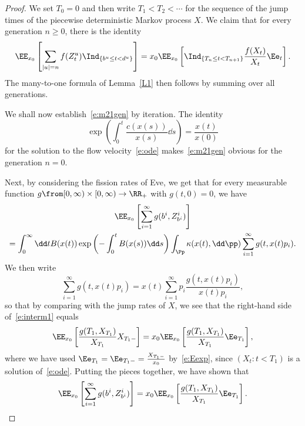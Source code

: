\begin{proof}
We set $T_0=0$ and then write $T_1<T_2<\dotsb$ for the sequence of the jump times of the piecewise deterministic Markov process $X$. We claim that for every generation $n\geq 0$, there is the identity
\begin{equation}\label{e:m21gen}
\EE_{x_0} \left[\sum_{|u|=n} f(Z^u_t) \Ind_{\{b^u \leq t < d^u\}} \right] = x_0\EE_{x_0}\left[\Ind_{\{T_n \leq t < T_{n+1}\}}\frac{f(X_t)}{X_t}\Ee_t \right].
\end{equation}
The many-to-one formula of Lemma~\ref{L1} then follows by summing over all generations.

We shall now establish~\eqref{e:m21gen} by iteration. The identity
\begin{equation}\label{e:Eexp}
\exp\left(\int_0^t \frac{c(x(s))}{x(s)}\dd s\right) = \frac{x(t)}{x(0)}
\end{equation}
for the solution to the flow velocity~\eqref{e:ode} makes~\eqref{e:m21gen} obvious for the generation $n=0$.


Next, by considering the fission rates of Eve, we get that for every measurable function $g\from [0,\infty)\times [0,\infty)\to \RR_+$ with $g(t,0)=0$, we have
\begin{multline}\label{e:interm1}
\EE_{x_0}\left[\sum_{i=1}^{\infty} g(b^i, Z^i_{b^i})\right] \\
=\int_0^{\infty} \dd t {B}(x(t)) \exp\left(-\int_0^t {B}(x(s)) \dd s\right) \int_{\Pp} \kappa(x(t), \dd \pp)
\sum_{i=1}^{\infty}g(t,x(t)p_i).
\end{multline}
We then write
\[
\sum_{i=1}^{\infty}g(t,x(t)p_i)=x(t) \sum_{i=1}^{\infty}p_i\frac{g(t,x(t)p_i)}{x(t)p_i},
\]
so that by comparing with the jump rates of $X$, we see that the right-hand side of~\eqref{e:interm1} equals
\[
\EE_{x_0}\left[\frac{g(T_1, X_{T_1})}{X_{T_1}}X_{T_1-}\right] = x_0 \EE_{x_0}\left[\frac{g(T_1, X_{T_1})}{X_{T_1}}\Ee_{T_1}\right],
\]
where we have used $\Ee_{T_1} = \Ee_{T_1-} = \frac{X_{T_1-}}{x_0}$ by~\eqref{e:Eexp}, since $(X_t: t < T_1)$ is a solution of~\eqref{e:ode}. Putting the pieces together, we have shown that
\begin{equation}\label{e:interm}
\EE_{x_0}\left[\sum_{i=1}^{\infty} g(b^i, Z^i_{b^i})\right]= x_0 \EE_{x_0}\left[\frac{g(T_1, X_{T_1})}{X_{T_1}}\Ee_{T_1}\right].
\end{equation}


\end{proof}
